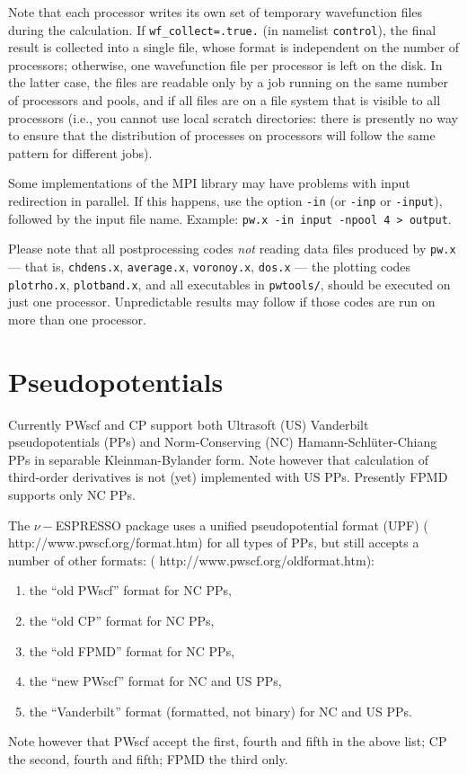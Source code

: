 \documentclass[12pt,a4paper]{article}
\begin{document}
Note that each processor writes its own set of temporary wavefunction
files during the calculation.
If \texttt{wf\_collect=.true.} (in namelist \texttt{control}), the
final result is collected into a single file, whose format is
independent on the number of processors; otherwise, one wavefunction
file per processor is left on the disk.
In the latter case, the files are readable only by a job running on
the same number of processors and pools, and if all files are on a
file system that is visible to all processors (i.e., you cannot use
local scratch directories: there is presently no way to ensure that
the distribution of processes on processors will follow the same
pattern for different jobs).

Some implementations of the MPI library may have problems with
input redirection in parallel.
If this happens, use the option \texttt{-in} (or \texttt{-inp} or
\texttt{-input}), followed by the input file name.
Example: \texttt{pw.x -in input -npool 4 > output}.

Please note that all postprocessing codes \emph{not} reading data
files produced by \texttt{pw.x} --- that is, \texttt{chdens.x},
\texttt{average.x}, \texttt{voronoy.x}, \texttt{dos.x} --- the
plotting codes \texttt{plotrho.x}, \texttt{plotband.x}, and all
executables in \texttt{pwtools/}, should be executed on just one
processor.
Unpredictable results may follow if those codes are run on more than
one processor.

\clearpage

\section{Pseudopotentials}
  \label{pseudopotentials}

Currently PWscf and CP support both Ultrasoft (US) Vanderbilt
pseudopotentials (PPs) and Norm-Conserving (NC)
Hamann-Schl\"uter-Chiang PPs in separable Kleinman-Bylander form.
Note however that calculation of third-order derivatives is not (yet)
implemented with US PPs. Presently FPMD supports only NC PPs.

The $\nu-$ESPRESSO package uses a unified pseudopotential format (UPF)
(%
                   {http://www.pwscf.org/format.htm})
for all types of PPs, but still accepts a number of other formats:
(%
                   {http://www.pwscf.org/oldformat.htm}):
\begin{enumerate}
  \item the ``old PWscf'' format for NC PPs,
  \item the ``old CP'' format for NC PPs,
  \item the ``old FPMD'' format for NC PPs,
  \item the ``new PWscf'' format for NC and US PPs,
  \item the ``Vanderbilt'' format (formatted, not binary) for NC and
        US PPs.
\end{enumerate}
Note however that PWscf accept the first, fourth and fifth in the
above list; CP the second, fourth and fifth; FPMD the third only.
\end{document}
